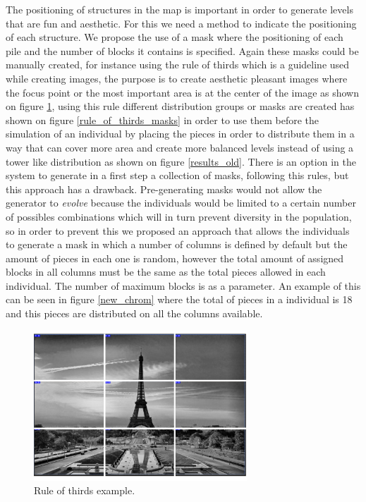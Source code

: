 \documentclass[conference]{IEEEtran}
\begin{document}
     The positioning of structures in the map is important in order to generate
     levels that are fun and aesthetic. For this we need a method to indicate the
     positioning of each structure. We propose the use of a mask where the
     positioning of each pile and the number of blocks it contains is specified.
     Again these masks could be manually created, for instance using the rule of
     thirds \cite{DarrenRowse} which is a guideline used while creating images,
     the purpose is to create aesthetic pleasant images where the focus point
     or the most important area is at the center of the image as shown on figure
     \ref{rule_of_thirds}, using this rule different distribution groups or
     masks are created has shown on figure \ref{rule_of_thirds_masks} in order
     to use them before the simulation of an individual by placing the pieces in
     order to distribute them in a way that can cover more area and create more
     balanced levels instead of using a tower like distribution as shown on
     figure \ref{results_old}. There is an option in the system to generate in a
     first step a collection of masks, following this rules, but this approach
     has a drawback. Pre-generating masks would not allow the generator to
     \textit{evolve} because the individuals would be limited to a certain
     number of possibles combinations which will in turn prevent diversity in
     the population, so in order to prevent this we proposed an approach that
     allows the individuals to generate a mask in which a number of columns is
     defined by default but the amount of pieces in each one is random, however
     the total amount of assigned blocks in all columns must be the same as the
     total pieces allowed in each individual. The number of maximum blocks is as
     a parameter. An example of this can be seen in figure \ref{new_chrom} where
     the total of pieces in a individual is 18 and this pieces are distributed
     on all the columns available.
     
    
    \begin{figure}[htbp]
        \centerline{\includegraphics[width=80mm]{Images/ruleofthirds_example.png}}
        \caption{Rule of thirds example.}
        \label{rule_of_thirds}
    \end{figure}
    
\end{document}
